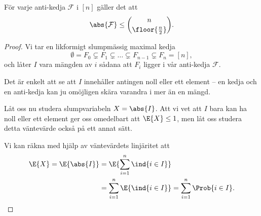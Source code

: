 \documentclass[nobib]{tufte-handout}
\begin{document}
\begin{lemma}
    För varje anti-kedja $\mathcal{F}$ i $[n]$ gäller det att
    $$\abs{\mathcal{F}} \leq \binom{n}{\floor{\frac{n}{2}}}.$$

    \begin{proof}
        Vi tar en likformigt slumpmässig maximal kedja
        $$\emptyset = F_0 \subsetneq F_1 \subsetneq \ldots \subsetneq F_{n-1} \subsetneq F_n = [n],$$
        och låter $I$ vara mängden av $i$ sådana att $F_i$ ligger i vår anti-kedja $\mathcal{F}$.

        Det är enkelt att se att $I$ innehåller antingen noll eller ett element -- en kedja och en anti-kedja kan ju omöjligen skära varandra i mer än en mängd.

        Låt oss nu studera slumpvariabeln $X = \abs{I}$. Att vi vet att $I$ bara kan ha noll eller ett element ger oss omedelbart att $\E{X} \leq 1$, men låt oss studera detta väntevärde också på ett annat sätt.

        Vi kan räkna med hjälp av väntevärdets linjäritet att
        \begin{align*}
            \E{X} = \E{\abs{I}} &= \E{\sum_{i=1}^{n} \ind{i \in I}}\\
            &= \sum_{i=1}^{n} \E{\ind{i \in I}} = \sum_{i=1}^{n} \Prob{i \in I}.
        \end{align*}


\end{proof}
\end{lemma}
\end{document}
